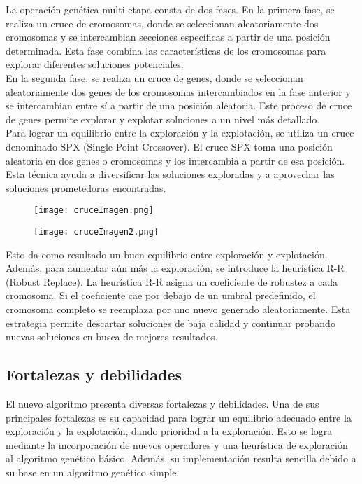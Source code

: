 La operación genética multi-etapa consta de dos fases. En la primera fase, se realiza un cruce de cromosomas, donde se seleccionan aleatoriamente dos cromosomas y se intercambian secciones específicas a partir de una posición determinada. Esta fase combina las características de los cromosomas para explorar diferentes soluciones potenciales.\\

En la segunda fase, se realiza un cruce de genes, donde se seleccionan aleatoriamente dos genes de los cromosomas intercambiados en la fase anterior y se intercambian entre sí a partir de una posición aleatoria. Este proceso de cruce de genes permite explorar y explotar soluciones a un nivel más detallado.\\

Para lograr un equilibrio entre la exploración y la explotación, se utiliza un cruce denominado SPX (Single Point Crossover). El cruce SPX toma una posición aleatoria en dos genes o cromosomas y los intercambia a partir de esa posición. Esta técnica ayuda a diversificar las soluciones exploradas y a aprovechar las soluciones prometedoras encontradas.

\begin{figure}[H]
	\centering
	\texttt{[image: cruceImagen.png]}
	\label{fig:cruce-cromosoma}
\end{figure}

\begin{figure}[H]
	\centering
	\texttt{[image: cruceImagen2.png]}
	\label{fig:cruce-gen}
\end{figure}


Esto da como resultado un buen equilibrio entre exploración y explotación. Además, para aumentar aún más la exploración, se introduce la heurística R-R (Robust Replace). La heurística R-R asigna un coeficiente de robustez a cada cromosoma. Si el coeficiente cae por debajo de un umbral predefinido, el cromosoma completo se reemplaza por uno nuevo generado aleatoriamente. Esta estrategia permite descartar soluciones de baja calidad y continuar probando nuevas soluciones en busca de mejores resultados.

\subsection{Fortalezas y debilidades}
El nuevo algoritmo presenta diversas fortalezas y debilidades. Una de sus principales fortalezas es su capacidad para lograr un equilibrio adecuado entre la exploración y la explotación, dando prioridad a la exploración. Esto se logra mediante la incorporación de nuevos operadores y una heurística de exploración al algoritmo genético básico. Además, su implementación resulta sencilla debido a su base en un algoritmo genético simple.\\

